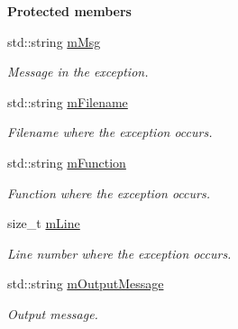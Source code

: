 \begin{Indent}{\bf Protected members}\par
\begin{DoxyCompactItemize}
\item 
std\+::string \hyperlink{classException_a9141b17564f091623cf5a3928e0e0ab3}{m\+Msg}\hypertarget{classException_a9141b17564f091623cf5a3928e0e0ab3}{}\label{classException_a9141b17564f091623cf5a3928e0e0ab3}

\begin{DoxyCompactList}\small\item\em Message in the exception. \end{DoxyCompactList}\item 
std\+::string \hyperlink{classException_a04156475e91fe60dc071c292cf5e2354}{m\+Filename}\hypertarget{classException_a04156475e91fe60dc071c292cf5e2354}{}\label{classException_a04156475e91fe60dc071c292cf5e2354}

\begin{DoxyCompactList}\small\item\em Filename where the exception occurs. \end{DoxyCompactList}\item 
std\+::string \hyperlink{classException_a9eb42c5d2040a0fb75af4d69efa657a1}{m\+Function}\hypertarget{classException_a9eb42c5d2040a0fb75af4d69efa657a1}{}\label{classException_a9eb42c5d2040a0fb75af4d69efa657a1}

\begin{DoxyCompactList}\small\item\em Function where the exception occurs. \end{DoxyCompactList}\item 
size\+\_\+t \hyperlink{classException_a2ece5a599bfb85307da33e61192feddf}{m\+Line}\hypertarget{classException_a2ece5a599bfb85307da33e61192feddf}{}\label{classException_a2ece5a599bfb85307da33e61192feddf}

\begin{DoxyCompactList}\small\item\em Line number where the exception occurs. \end{DoxyCompactList}\item 
std\+::string \hyperlink{classException_a1a8fc6e1adf85832d1dcb253cb5c6329}{m\+Output\+Message}\hypertarget{classException_a1a8fc6e1adf85832d1dcb253cb5c6329}{}\label{classException_a1a8fc6e1adf85832d1dcb253cb5c6329}

\begin{DoxyCompactList}\small\item\em Output message. \end{DoxyCompactList}\end{DoxyCompactItemize}
\end{Indent}



